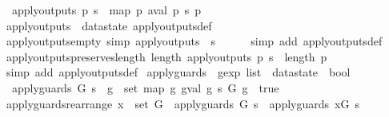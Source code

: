 \begin{isabellebody}
\ \ {\isachardoublequoteopen}apply{\isacharunderscore}outputs\ p\ s\ {\isacharequal}\ map\ {\isacharparenleft}{\isasymlambda}p{\isachardot}\ aval\ p\ s{\isacharparenright}\ p{\isachardoublequoteclose}\isanewline
\isanewline
{}\isamarkupfalse%
\ apply{\isacharunderscore}outputs\ {\isacharequal}\ datastate\ apply{\isacharunderscore}outputs{\isacharunderscore}def\isanewline
\isanewline
{}\isamarkupfalse%
\ apply{\isacharunderscore}outputs{\isacharunderscore}empty\ {\isacharbrackleft}simp{\isacharbrackright}{\isacharcolon}\ {\isachardoublequoteopen}apply{\isacharunderscore}outputs\ {\isacharbrackleft}{\isacharbrackright}\ s\ {\isacharequal}\ {\isacharbrackleft}{\isacharbrackright}{\isachardoublequoteclose}\isanewline
%
\isadelimproof
\ \ %
\endisadelimproof
%
\isatagproof
{}\isamarkupfalse%
\ {\isacharparenleft}simp\ add{\isacharcolon}\ apply{\isacharunderscore}outputs{\isacharunderscore}def{\isacharparenright}%
\endisatagproof
{\isafoldproof}%
%
\isadelimproof
\isanewline
%
\endisadelimproof
\isanewline
{}\isamarkupfalse%
\ apply{\isacharunderscore}outputs{\isacharunderscore}preserves{\isacharunderscore}length{\isacharcolon}\ {\isachardoublequoteopen}length\ {\isacharparenleft}apply{\isacharunderscore}outputs\ p\ s{\isacharparenright}\ {\isacharequal}\ length\ p{\isachardoublequoteclose}\isanewline
%
\isadelimproof
\ \ %
\endisadelimproof
%
\isatagproof
{}\isamarkupfalse%
\ {\isacharparenleft}simp\ add{\isacharcolon}\ apply{\isacharunderscore}outputs{\isacharunderscore}def{\isacharparenright}%
\endisatagproof
{\isafoldproof}%
%
\isadelimproof
\isanewline
%
\endisadelimproof
\isanewline
{}\isamarkupfalse%
\ apply{\isacharunderscore}guards\ {\isacharcolon}{\isacharcolon}\ {\isachardoublequoteopen}gexp\ list\ {\isasymRightarrow}\ datastate\ {\isasymRightarrow}\ bool{\isachardoublequoteclose}\ \isanewline
\ \ {\isachardoublequoteopen}apply{\isacharunderscore}guards\ G\ s\ {\isacharequal}\ {\isacharparenleft}{\isasymforall}g\ {\isasymin}\ set\ {\isacharparenleft}map\ {\isacharparenleft}{\isasymlambda}g{\isachardot}\ gval\ g\ s{\isacharparenright}\ G{\isacharparenright}{\isachardot}\ g\ {\isacharequal}\ true{\isacharparenright}{\isachardoublequoteclose}\isanewline
\isanewline
{}\isamarkupfalse%
\ apply{\isacharunderscore}guards{\isacharunderscore}rearrange{\isacharcolon}\ {\isachardoublequoteopen}x\ {\isasymin}\ set\ G\ {\isasymLongrightarrow}\ apply{\isacharunderscore}guards\ G\ s\ {\isacharequal}\ apply{\isacharunderscore}guards\ {\isacharparenleft}x{\isacharhash}G{\isacharparenright}\ s{\isachardoublequoteclose}\isanewline

\end{isabellebody}
